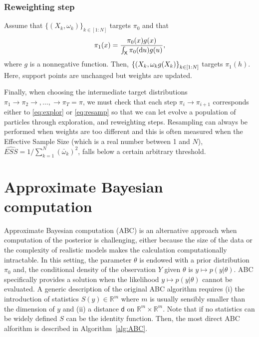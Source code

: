 \documentclass[english,graybox,envcountchap,envcountsame,sectrefs,shortlabels]{svmono}
\theoremstyle{style}
\newcommand{\Xset}{\mathsf{X}}
\begin{document}
\subsubsection{Reweighting step}
Assume that $\{(X_k,\omega_k)\}_{k\in[1:N]}$ targets $\pi_0$ and that
\begin{equation} \label{eq:resamp}
\pi_1(x)=\frac{ \pi_0(x) g(x) }{\int_\Xset \pi_0(\rmd u) g(u) },
\end{equation}
where $g$ is a nonnegative function. Then,  $\left\{ (X_k,\omega_k g(X_k) \right\}_{k\in[1:N]}$ targets $\pi_1(h)$. Here, support points are unchanged but weights are updated.

Finally, when choosing the intermediate target distributions $\pi_1\rightarrow \pi_2\rightarrow,\ldots,\rightarrow \pi_T=\pi$, we must check that each step $\pi_i \rightarrow \pi_{i+1}$ corresponds either to \eqref{eq:explor} or \eqref{eq:resamp} so that we can let evolve a population of particles through exploration, and reweighting steps. Resampling can always be performed when weights are too different and this is often measured when the Effective Sample Size (which is a real number between 1 and $N$), $\widehat{ESS}=1/\sum_{k=1}^N (\bar \omega_k)^2$, falls below a certain arbitrary threshold.



\section{Approximate Bayesian computation}
Approximate Bayesian computation (ABC) is an alternative approach when computation of the posterior is challenging, either because the size of the data or the complexity of realistic models makes the calculation computationally intractable. In this setting, the parameter $\theta$ is endowed with a prior distribution $\pi_0$ and, the conditional density of the observation $Y$ given $\theta$ is $y\mapsto p(y|\theta)$. ABC specifically provides a solution  when the likelihood $y\mapsto p(y|\theta)$ cannot be evaluated. A generic description of the original ABC algorithm requires (i) the introduction of statistics $S(y)\in\mathbb{R}^m$ where $m$ is usually sensibly smaller than the dimension of $y$ and (ii) a distance $\mathsf{d}$ on $\mathbb{R}^m\times \mathbb{R}^m$. Note that if no statistics can be widely defined $S$ can be the identity function. Then, the most direct ABC alforithm is described in Algorithm~\ref{alg:ABC}.

\medskip
\end{document}
